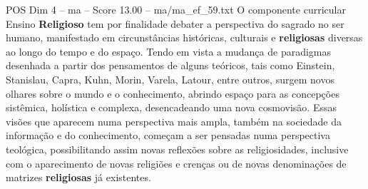 \begin{textsample}{POS Dim 4 – ma – Score 13.00 – ma/ma\_ef\_59.txt}
O componente curricular Ensino \textbf{Religioso} tem por finalidade debater a perspectiva do sagrado no ser humano, manifestado em circunstâncias históricas, culturais e \textbf{religiosas} diversas ao longo do tempo e do espaço.
Tendo em vista a mudança de paradigmas desenhada a partir dos pensamentos de alguns teóricos, tais como Einstein, Stanislau, Capra, Kuhn, Morin, Varela, Latour, entre outros, surgem novos olhares sobre o mundo e o conhecimento, abrindo espaço para as concepções sistêmica, holística e complexa, desencadeando uma nova cosmovisão.
Essas visões que aparecem numa perspectiva mais ampla, também na sociedade da informação e do conhecimento, começam a ser pensadas numa perspectiva teológica, possibilitando assim novas reflexões sobre as religiosidades, inclusive com o aparecimento de novas religiões e crenças ou de novas denominações de matrizes \textbf{religiosas} já existentes.

\end{textsample}
